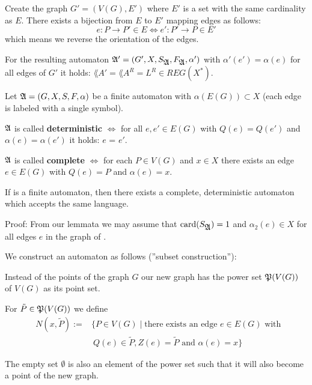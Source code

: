Create the graph $G' = (V(G), E')$ where $E'$ is a set with the same cardinality
as $E$. There exists a bijection from $E$ to $E'$ mapping edges as follows:
\[ e : P \to P' \in E \Leftrightarrow e' : P' \to P \in E' \]
which means we reverse the orientation of the edges.

For the resulting automaton $\mbox{$\mathfrak{A'}$} = (G', X, S_{\mbox{$\mathfrak{A}$}},
F_{\mbox{$\mathfrak{A}$}}, \alpha')$ with $\alpha'(e') = \alpha(e)$ for all edges of $G'$
it holds: $\lang{A'} = \lang{A}^R = L^R \in REG(X^*)$.

\begin{definition}
Let $\mbox{$\mathfrak{A}$} = (G, X, S, F, \alpha)$ be a finite automaton with
$\alpha(E(G)) \subset X$ (each edge is labeled with a single
symbol).

$\mbox{$\mathfrak{A}$}$ is called {\bf deterministic} $\Leftrightarrow$ for all $e, e'
\in E(G)$ with $Q(e) = Q(e')$ and $\alpha(e) = \alpha(e')$ it holds: $e$ = $e'$.

$\mbox{$\mathfrak{A}$}$ is called {\bf complete} $\Leftrightarrow$ for each $P \in V(G)$
and $x \in X$ there exists an edge $e \in E(G)$ with $Q(e) = P$ and $\alpha(e)
= x$.
\end{definition}

\begin{theorem}
If  is a finite automaton, then there exists a complete,
deterministic automaton  which accepts the same language.
\end{theorem}

Proof: From our lemmata we may assume that $\mathrm{card}(S_{\mbox{$\mathfrak{A}$}}) = 1$ and
$\alpha_2(e) \in X$ for all edges $e$ in the graph of .

We construct an automaton  as follows (''subset construction''):

Instead of the points of the graph $G$ our new graph has the power set
$\mathfrak{P}(V(G))$ of $V(G)$ as its point set.

For $\tilde{P} \in \mathfrak{P}(V(G))$ we define 
\begin{eqnarray*}
& N(x, \tilde{P}) := & \{ P \in V(G) \mid \mbox{there exists an edge } e \in
E(G) \mbox{ with } \\
& & \ Q(e) \in \tilde{P}, Z(e) = \tilde{P} \mbox{ and } \alpha(e) = x \} 
\end{eqnarray*}

The empty set $\emptyset$ is also an element of the power set such that it will
also become a point of the new graph.

